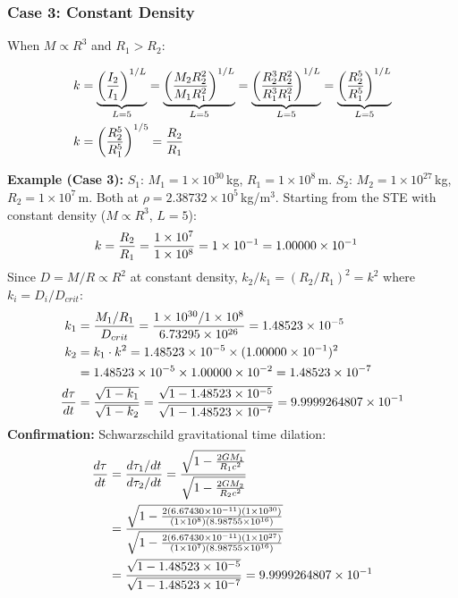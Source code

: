 \subsubsection*{Case 3: Constant Density}

When $M \propto R^3$ and $R_1 > R_2$:

\begin{align}
k &= \underbrace{\left(\frac{I_2}{I_1}\right)^{1/L}}_{L=5}
= \underbrace{\left(\frac{M_2 R_2^2}{M_1 R_1^2}\right)^{1/L}}_{L=5}
= \underbrace{\left(\frac{R_2^3 R_2^2}{R_1^3 R_1^2}\right)^{1/L}}_{L=5}
= \underbrace{\left(\frac{R_2^5}{R_1^5}\right)^{1/L}}_{L=5} \notag \\
k &= \left(\frac{R_2^5}{R_1^5}\right)^{1/5}
= \frac{R_2}{R_1}
\end{align}

\begin{mdframed}
\textbf{Example (Case 3):} $S_1$: $M_1 = 1 \times 10^{30}$\,kg, $R_1 = 1 \times 10^{8}$\,m. $S_2$: $M_2 = 1 \times 10^{27}$\,kg, $R_2 = 1 \times 10^{7}$\,m. Both at $\rho = 2.38732 \times 10^{5}$\,kg/m$^3$. Starting from the STE with constant density ($M \propto R^3$, $L = 5$):
\begin{align}
k &= \frac{R_2}{R_1}
= \frac{1 \times 10^{7}}{1 \times 10^{8}}
= 1 \times 10^{-1}
= 1.00000 \times 10^{-1} \notag
\end{align}
Since $D = M/R \propto R^2$ at constant density, $k_2/k_1 = (R_2/R_1)^2 = k^2$ where $k_i = D_i/D_{crit}$:
\begin{align}
k_1 &= \frac{M_1/R_1}{D_{crit}}
= \frac{1 \times 10^{30}/1 \times 10^{8}}{6.73295 \times 10^{26}}
= 1.48523 \times 10^{-5} \notag \\
k_2 &= k_1 \cdot k^2
= 1.48523 \times 10^{-5} \times (1.00000 \times 10^{-1})^2 \notag \\
&= 1.48523 \times 10^{-5} \times 1.00000 \times 10^{-2}
= 1.48523 \times 10^{-7} \notag \\
\frac{d\tau}{dt} &= \frac{\sqrt{1 - k_1}}{\sqrt{1 - k_2}}
= \frac{\sqrt{1 - 1.48523 \times 10^{-5}}}{\sqrt{1 - 1.48523 \times 10^{-7}}}
= 9.9999264807 \times 10^{-1} \notag
\end{align}
\textbf{Confirmation:} Schwarzschild gravitational time dilation:
\begin{align}
\frac{d\tau}{dt} &= \frac{d\tau_1 / dt}{d\tau_2 / dt}
= \frac{\sqrt{1 - \frac{2GM_1}{R_1 c^2}}}{\sqrt{1 - \frac{2GM_2}{R_2 c^2}}} \notag \\
&= \frac{\sqrt{1 - \frac{2(6.67430 \times 10^{-11})(1 \times 10^{30})}{(1 \times 10^{8})(8.98755 \times 10^{16})}}}{\sqrt{1 - \frac{2(6.67430 \times 10^{-11})(1 \times 10^{27})}{(1 \times 10^{7})(8.98755 \times 10^{16})}}} \notag \\
&= \frac{\sqrt{1 - 1.48523 \times 10^{-5}}}{\sqrt{1 - 1.48523 \times 10^{-7}}}
= 9.9999264807 \times 10^{-1} \notag
\end{align}
\end{mdframed}


